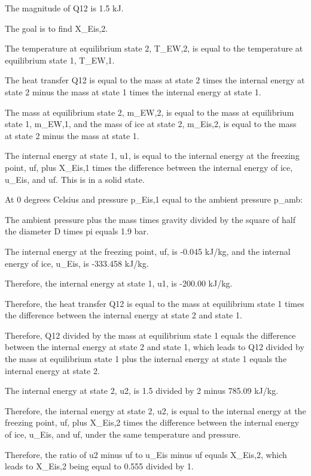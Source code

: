 The magnitude of Q12 is 1.5 kJ.

The goal is to find X_Eis,2.

The temperature at equilibrium state 2, T_EW,2, is equal to the temperature at equilibrium state 1, T_EW,1.

The heat transfer Q12 is equal to the mass at state 2 times the internal energy at state 2 minus the mass at state 1 times the internal energy at state 1.

The mass at equilibrium state 2, m_EW,2, is equal to the mass at equilibrium state 1, m_EW,1, and the mass of ice at state 2, m_Eis,2, is equal to the mass at state 2 minus the mass at state 1.

The internal energy at state 1, u1, is equal to the internal energy at the freezing point, uf, plus X_Eis,1 times the difference between the internal energy of ice, u_Eis, and uf. This is in a solid state.

At 0 degrees Celsius and pressure p_Eis,1 equal to the ambient pressure p_amb:

The ambient pressure plus the mass times gravity divided by the square of half the diameter D times pi equals 1.9 bar.

The internal energy at the freezing point, uf, is -0.045 kJ/kg, and the internal energy of ice, u_Eis, is -333.458 kJ/kg.

Therefore, the internal energy at state 1, u1, is -200.00 kJ/kg.

Therefore, the heat transfer Q12 is equal to the mass at equilibrium state 1 times the difference between the internal energy at state 2 and state 1.

Therefore, Q12 divided by the mass at equilibrium state 1 equals the difference between the internal energy at state 2 and state 1, which leads to Q12 divided by the mass at equilibrium state 1 plus the internal energy at state 1 equals the internal energy at state 2.

The internal energy at state 2, u2, is 1.5 divided by 2 minus 785.09 kJ/kg.

Therefore, the internal energy at state 2, u2, is equal to the internal energy at the freezing point, uf, plus X_Eis,2 times the difference between the internal energy of ice, u_Eis, and uf, under the same temperature and pressure.

Therefore, the ratio of u2 minus uf to u_Eis minus uf equals X_Eis,2, which leads to X_Eis,2 being equal to 0.555 divided by 1.